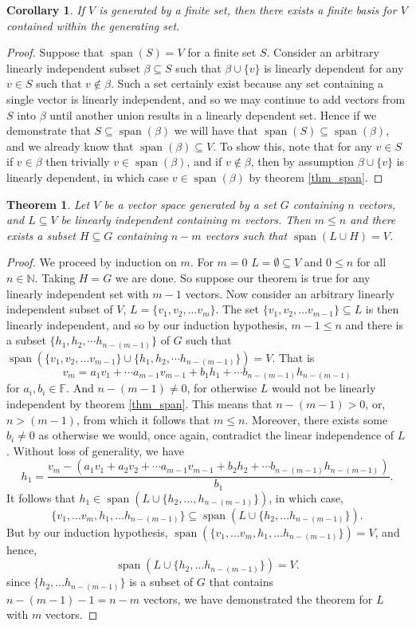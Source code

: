 \documentclass[oneside, 12pt]{book}
\DeclareMathOperator{\spn}{span}
\newtheorem{thm}{Theorem}[section]
\newtheorem{cor}{Corollary}[section]
\theoremstyle{definition}
\begin{document}
\begin{cor}
\label{cor_bascard}
If $V$ is generated by a finite set, then there exists a finite basis for $V$ contained within the generating set.
\end{cor}
\begin{proof}
  Suppose that $\spn(S)=V$ for a finite set $S$. Consider an arbitrary linearly independent subset $\beta \subseteq S$ such that $\beta \cup \{v\}$ is linearly dependent for any $v \in S$ such that $v \notin \beta$. Such a set certainly exist because any set containing a single vector is linearly independent, and so we may continue to add vectors from $S$ into $\beta$ until another union results in a linearly dependent set. Hence if we demonstrate that $S \subseteq \spn(\beta)$ we will have that $\spn(S)\subseteq \spn(\beta)$, and we already know that $\spn(\beta)\subseteq V$. To show this, note that for any $v \in S$ if $v \in \beta$ then trivially $v \in \spn(\beta)$, and if $v \notin \beta$, then by assumption $\beta \cup \{v\}$ is linearly dependent, in which case $v \in \spn(\beta)$ by theorem \ref{thm_span}.
\end{proof}
\begin{thm}
\label{thm_replace}
  Let $V$ be a vector space generated by a set $G$ containing $n$ vectors, and $L \subseteq V$ be linearly independent containing $m$ vectors. Then $m \leq n$
  and there exists a subset $H \subseteq G$ containing $n-m$ vectors such that $\spn(L \cup H)=V$.
\end{thm}
\begin{proof}
  We proceed by induction on $m$. For $m=0$ $L=\emptyset \subseteq V$ and $0 \leq n$ for all $n \in \mathbb{N}$. Taking $H=G$ we are done. So suppose our theorem is true for any linearly independent set with $m-1$ vectors. Now consider an arbitrary linearly independent subset of $V$, $L=\{v_{1}, v_{2}, \dots v_{m}\}$. The set $\{v_{1}, v_{2}, \dots v_{m-1}\} \subseteq L$ is then linearly independent, and so by our induction hypothesis, $m-1 \leq n$ and there is a subset $\{h_{1}, h_{2}, \cdots h_{n-(m-1)}\}$ of $G$ such that $\spn(\{v_{1}, v_{2}, \dots v_{m-1}\} \cup \{h_{1}, h_{2}, \cdots h_{n-(m-1)}\})=V$. That is
  \[v_{m}=a_{1}v_{1}+ \cdots a_{m-1}v_{m-1}+b_{1}h_{1}+ \cdots b_{n-(m-1)}h_{n-(m-1)}\]
  for $a_{i}, b_{i} \in \mathbb{F}$. And $n-(m-1)\neq0$, for otherwise $L$ would not be linearly independent by theorem \ref{thm_span}. This means that $n-(m-1)>0$, or, $n>(m-1)$, from which it follows that $m \leq n$. Moreover, there exists some $b_{i}\neq 0$ as otherwise we would, once again, contradict the linear independence of $L$. Without loss of generality, we have
  \[h_{1}=\frac{v_{m}-(a_{1}v_{1}+a_{2}v_{2}+\cdots a_{m-1}v_{m-1}+b_{2}h_{2}+\cdots b_{n-(m-1)}h_{n-(m-1)})}{b_{1}}.\]
  It follows that $h_{1} \in \spn(L \cup \{h_{2}, \dots, h_{n-(m-1)}\})$,  in which case,
  \[\{v_{1}, \dots v_{m}, h_{1}, \dots h_{n-(m-1)}\} \subseteq \spn(L \cup \{h_{2}, \dots h_{n-(m-1)}\}).\]
  But by our induction hypothesis, $\spn(\{v_{1}, \dots v_{m}, h_{1}, \dots h_{n-(m-1)}\})=V$, and hence,\[\spn(L \cup \{h_{2}, \dots h_{n-(m-1)}\})=V.\]
  since $\{h_{2}, \dots h_{n-(m-1)}\}$ is a subset of $G$ that contains $n-(m-1)-1=n-m$ vectors, we have demonstrated the theorem for $L$ with $m$ vectors.
\end{proof}
\end{document}
